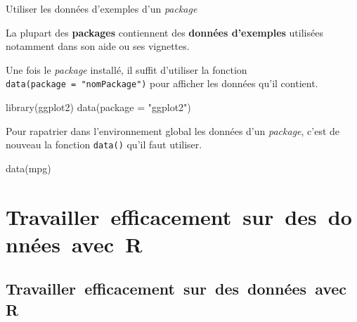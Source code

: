 \documentclass[12pt,ignorenonframetext,handout,]{beamer}
\newenvironment{Shaded}{}{}
\newcommand{\DataTypeTok}[1]{#1}
\newcommand{\KeywordTok}[1]{\textcolor[rgb]{0.00,0.00,1.00}{#1}}
\newcommand{\NormalTok}[1]{#1}
\newcommand{\StringTok}[1]{\textcolor[rgb]{0.00,0.50,0.50}{#1}}
\renewenvironment{Shaded}{\begin{snugshade}}{\end{snugshade}}
\begin{document}
\begin{frame}[fragile]{Utiliser les données d’exemples d’un
\emph{package}}
\protect\hypertarget{utiliser-les-donnees-dexemples-dun-package}{}

La plupart des \textbf{packages} contiennent des \textbf{données
d’exemples} utilisées notamment dans son aide ou ses vignettes.

Une fois le \emph{package} installé, il suffit d’utiliser la fonction
\texttt{data(package\ =\ "nomPackage")} pour afficher les données qu’il
contient.

\begin{Shaded}
\begin{Highlighting}[]
\KeywordTok{library}\NormalTok{(ggplot2)}
\KeywordTok{data}\NormalTok{(}\DataTypeTok{package =} \StringTok{"ggplot2"}\NormalTok{)}
\end{Highlighting}
\end{Shaded}

\pause Pour \og rapatrier \fg{} dans l’environnement global les données
d’un \emph{package}, c’est de nouveau la fonction \texttt{data()} qu’il
faut utiliser.

\begin{Shaded}
\begin{Highlighting}[]
\KeywordTok{data}\NormalTok{(mpg)}
\end{Highlighting}
\end{Shaded}

\end{frame}

\hypertarget{travaillerefficacementsurdesdonneesavecr}{%
\section{Travailler~efficacement~sur~des~données~avec~R}\label{travaillerefficacementsurdesdonneesavecr}}

\hypertarget{travaillerefficacementsurdesdonneesavecr-1}{%
\subsection*{Travailler~efficacement~sur~des~données~avec~R}\label{travaillerefficacementsurdesdonneesavecr-1}}
\end{document}
